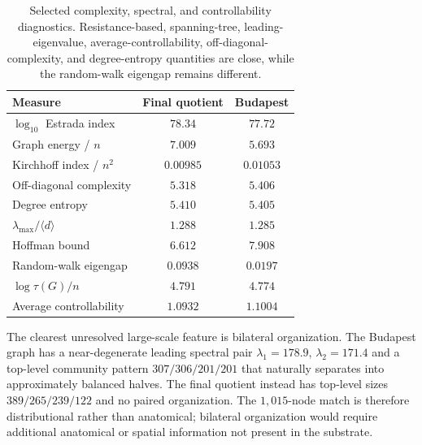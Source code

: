 \documentclass[12pt]{article}
\begin{document}
\begin{table}[H]
\centering
\small
\begin{tabular}{lcc}
\toprule
Measure & Final quotient & Budapest\\
\midrule
\(\log_{10}\) Estrada index & \(78.34\) & \(77.72\)\\
Graph energy / \(n\) & \(7.009\) & \(5.693\)\\
Kirchhoff index / \(n^2\) & \(0.00985\) & \(0.01053\)\\
Off-diagonal complexity & \(5.318\) & \(5.406\)\\
Degree entropy & \(5.410\) & \(5.405\)\\
\(\lambda_{\max}/\langle d\rangle\) & \(1.288\) & \(1.285\)\\
Hoffman bound & \(6.612\) & \(7.908\)\\
Random-walk eigengap & \(0.0938\) & \(0.0197\)\\
\(\log\tau(G)/n\) & \(4.791\) & \(4.774\)\\
Average controllability & \(1.0932\) & \(1.1004\)\\
\bottomrule
\end{tabular}
\caption{Selected complexity, spectral, and controllability diagnostics.  Resistance-based, spanning-tree, leading-eigenvalue, average-controllability, off-diagonal-complexity, and degree-entropy quantities are close, while the random-walk eigengap remains different.}
\label{tab:final-complexity}
\end{table}

The clearest unresolved large-scale feature is bilateral organization.  The
Budapest graph has a near-degenerate leading spectral pair
\(\lambda_1=178.9\), \(\lambda_2=171.4\) and a top-level community pattern
\(307/306/201/201\) that naturally separates into approximately balanced
halves.  The final quotient instead has top-level sizes
\(389/265/239/122\) and no paired organization.  The \(1{,}015\)-node match is
therefore distributional rather than anatomical; bilateral organization
would require additional anatomical or spatial information not present in
the substrate.
\end{document}
